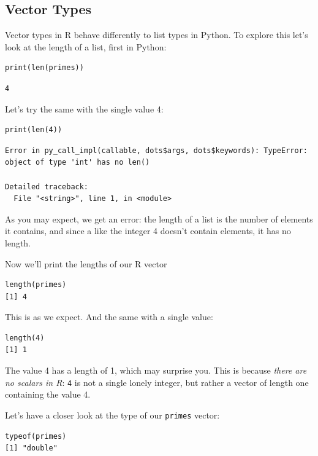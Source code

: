 \subsection{Vector Types}

Vector types in R behave differently to list types in Python.
To explore this let's look at the length of a list, first in Python:

\begin{lstlisting}
print(len(primes))
\end{lstlisting}

\begin{lstlisting}
4
\end{lstlisting}

Let's try the same with the single value 4:

\begin{lstlisting}
print(len(4))
\end{lstlisting}

\begin{lstlisting}
Error in py_call_impl(callable, dots$args, dots$keywords): TypeError: object of type 'int' has no len()

Detailed traceback: 
  File "<string>", line 1, in <module>
\end{lstlisting}

As you may expect, we get an error:
the length of a list is the number of elements it contains,
and since a  like the integer 4 doesn't contain elements,
it has no length.

Now we'll print the lengths of our R vector

\begin{lstlisting}
length(primes)
[1] 4
\end{lstlisting}

This is as we expect. And the same with a single value:

\begin{lstlisting}
length(4)
[1] 1
\end{lstlisting}

The value 4 has a length of 1, which may surprise you.
This is because \emph{there are no scalars in R}:
\texttt{4} is not a single lonely integer,
but rather a vector of length one containing the value 4.

Let's have a closer look at the type of our \lstinline{primes} vector:

\begin{lstlisting}
typeof(primes)
[1] "double"
\end{lstlisting}

